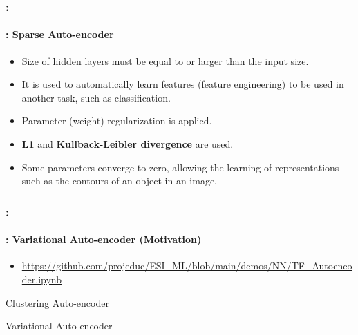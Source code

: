 \documentclass[xcolor=table]{beamer}
\begin{document}
\begin{frame}
	\frametitle{\insertshortsubtitle: \insertsection}
	\framesubtitle{\insertsubsection: Sparse Auto-encoder}
	
	\begin{itemize}
		\item Size of hidden layers must be equal to or larger than the input size.
		\item It is used to automatically learn features (feature engineering) to be used in another task, such as classification.
		\item Parameter (weight) regularization is applied.
		\item \textbf{L1} and \textbf{Kullback-Leibler divergence} are used.
		\item Some parameters converge to zero, allowing the learning of representations such as the contours of an object in an image.
	\end{itemize}

\end{frame}

\begin{frame}
	\frametitle{\insertshortsubtitle: \insertsection}
	\framesubtitle{\insertsubsection: Variational Auto-encoder (Motivation)}
	
	\begin{itemize}
		\item {\scriptsize\url{https://github.com/projeduc/ESI_ML/blob/main/demos/NN/TF_Autoencoder.ipynb}}
	\end{itemize}
	
	\begin{minipage}{0.47\textwidth} 
		\begin{center}
			Clustering Auto-encoder
		\end{center}\vskip-6pt
	\end{minipage}
	\begin{minipage}{0.47\textwidth}
		\begin{center}
			Variational Auto-encoder
		\end{center}\vskip-6pt
	\end{minipage}
	
\end{frame}
\end{document}
